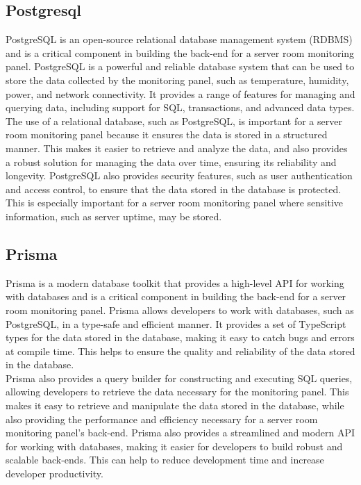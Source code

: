     \subsection{Postgresql}
    PostgreSQL is an open-source relational database management system (RDBMS) and is a critical component in building the back-end for a server room monitoring panel. PostgreSQL is a powerful and reliable database system that can be used to store the data collected by the monitoring panel, such as temperature, humidity, power, and network connectivity. It provides a range of features for managing and querying data, including support for SQL, transactions, and advanced data types.
    The use of a relational database, such as PostgreSQL, is important for a server room monitoring panel because it ensures the data is stored in a structured manner. This makes it easier to retrieve and analyze the data, and also provides a robust solution for managing the data over time, ensuring its reliability and longevity. PostgreSQL also provides security features, such as user authentication and access control, to ensure that the data stored in the database is protected. This is especially important for a server room monitoring panel where sensitive information, such as server uptime, may be stored.\cite{postgresql}
    \subsection{Prisma} 
    Prisma is a modern database toolkit that provides a high-level API for working with databases and is a critical component in building the back-end for a server room monitoring panel. Prisma allows developers to work with databases, such as PostgreSQL, in a type-safe and efficient manner. It provides a set of TypeScript types for the data stored in the database, making it easy to catch bugs and errors at compile time. This helps to ensure the quality and reliability of the data stored in the database.\\
    Prisma also provides a query builder for constructing and executing SQL queries, allowing developers to retrieve the data necessary for the monitoring panel. This makes it easy to retrieve and manipulate the data stored in the database, while also providing the performance and efficiency necessary for a server room monitoring panel's back-end. Prisma also provides a streamlined and modern API for working with databases, making it easier for developers to build robust and scalable back-ends. This can help to reduce development time and increase developer productivity.\cite{prisma}
